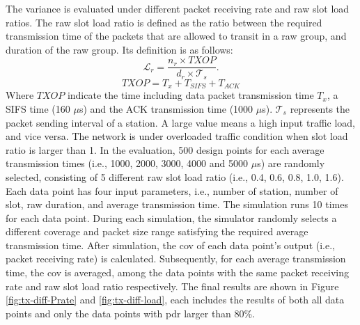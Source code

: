 The variance is evaluated under different packet receiving rate and \gls{raw} slot load ratios. The \gls{raw} slot load ratio is defined as the ratio between the required transmission time of the 
packets that are allowed to transit in a \gls{raw} group, and duration of the \gls{raw} group. Its definition is as follows:
 \\
\begin{equation}
\mathcal{L}_{r} = \frac {n_r \times TXOP} {d_r \times \mathcal{T}_s}. 
\end{equation}
\begin{equation}
TXOP = T_x + T_{SIFS} +  T_{ACK}
\end{equation}
Where $TXOP$ indicate the time including data packet transmission time $T_x$, a SIFS time (160 $\mu$s) and the ACK transmission time (1000 $\mu$s). $\mathcal{T}_s$ represents the packet sending interval of a station. A large value means a high input traffic load, and vice versa. The network is under overloaded traffic condition when slot load ratio is larger than 1.
In the evaluation, 500 design points for each average transmission times (i.e., 1000, 2000, 3000, 4000 and 5000 $\mu$s) are randomly selected, 
consisting of 5 different \gls{raw} slot load ratio (i.e., 0.4, 0.6, 0.8, 1.0, 1.6). Each data point has four input parameters, i.e., number of station, number of slot, \gls{raw} duration, and average transmission time. The simulation runs 10 times for each data point. During each simulation, the simulator randomly selects a different coverage and packet size range satisfying the required average transmission time. After simulation, the \gls{cov} of each data point's output (i.e., packet receiving rate) is calculated. Subsequently, for each average transmission time, the \gls{cov} is averaged, among the data points with the same packet receiving rate and \gls{raw} slot load ratio respectively. The final results are shown in Figure \ref{fig:tx-diff-Prate} and \ref{fig:tx-diff-load}, each includes the results of both all data points and only the data points with \gls{pdr} larger than 80\%.



